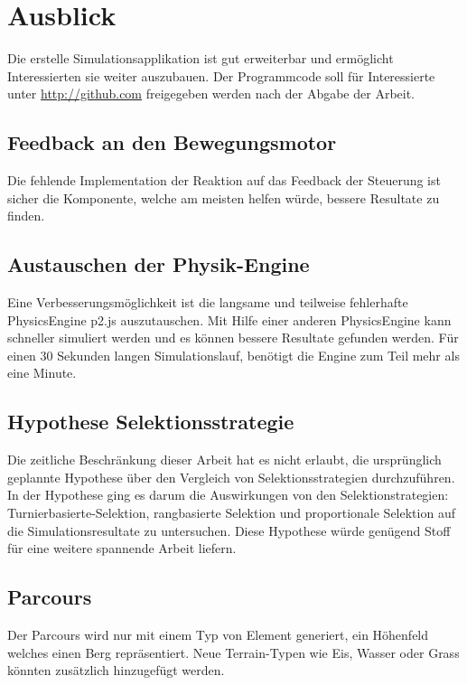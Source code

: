   \section{Ausblick\label{sec:ausblick}}
    Die erstelle Simulationsapplikation ist gut erweiterbar und ermöglicht Interessierten sie weiter auszubauen.
    Der Programmcode soll für Interessierte unter \url{http://github.com} freigegeben werden nach der Abgabe der Arbeit.

    \subsection{Feedback an den Bewegungsmotor\label{sec:PerspectiveFeedback}}
      Die fehlende Implementation der Reaktion auf das Feedback der Steuerung ist sicher die Komponente,
      welche am meisten helfen würde, bessere Resultate zu finden.

    \subsection{Austauschen der Physik-Engine}
      Eine Verbesserungsmöglichkeit ist die langsame und teilweise fehlerhafte \gls{PhysicsEngine} p2.js auszutauschen.
      Mit Hilfe einer anderen \gls{PhysicsEngine} kann schneller simuliert werden und es können bessere Resultate gefunden werden.
      Für einen 30 Sekunden langen Simulationslauf, benötigt die Engine zum Teil mehr als eine Minute.

    \subsection{Hypothese Selektionsstrategie}
      Die zeitliche Beschränkung dieser Arbeit hat es nicht erlaubt,
      die ursprünglich geplannte Hypothese über den Vergleich von Selektionsstrategien durchzuführen.
      In der Hypothese ging es darum die Auswirkungen von den Selektionstrategien: Turnierbasierte-Selektion, rangbasierte Selektion
      und proportionale Selektion auf die Simulationsresultate zu untersuchen.
      Diese Hypothese würde genügend Stoff für eine weitere spannende Arbeit liefern.

    \subsection{Parcours}
      Der Parcours wird nur mit einem Typ von Element generiert, ein Höhenfeld welches einen Berg repräsentiert.
      Neue Terrain-Typen wie Eis, Wasser oder Grass könnten zusätzlich hinzugefügt werden.





